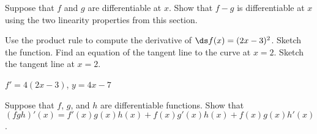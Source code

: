 \begin{enumialphparenastyle}
\begin{ex} 
Suppose that $f$ and $g$ are differentiable at $x$. Show
that $f-g$ is differentiable at $x$ using the two linearity
properties from this section.
\end{ex}

\begin{ex} 
Use the product rule to compute the derivative of $\ds f(x)=(2x-3)^2$.
 Sketch the function.  Find an equation of the tangent line to the curve at
 $x=2$.  Sketch the tangent line at $x=2$.
\begin{sol}
$f'=4(2x-3)$, $y=4x-7$
\end{sol}
\end{ex}

\begin{ex} 
Suppose that $f$, $g$, and $h$ are differentiable functions.
Show that $(fgh)'(x) = f'(x) g(x)h(x) + f(x)g'(x) h(x) + f(x) g(x)
h'(x)$.
\end{ex}

%
%



\end{enumialphparenastyle}
